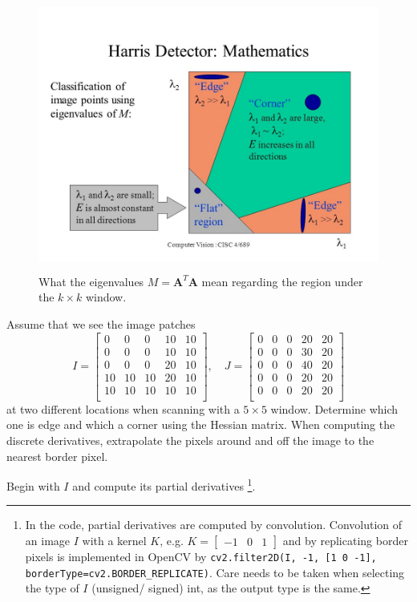 \documentclass[a4paper]{article}
\begin{document}
\begin{figure}[H]
    \centering
    \includegraphics[height=9cm]{img/opt_flow/harris_detector_eigen.jpg}
    \caption{What the eigenvalues $M = \textbf{A}^T\textbf{A}$ mean regarding the region under the $k\times k$ window.}
\end{figure}
\begin{exmp}
Assume that we see the image patches
\[
I = 
\begin{bmatrix}
0 & 0 & 0 & 10 & 10 \\
0 & 0 & 0 & 10 & 10\\
0 & 0 & 0& 20 & 10 \\
10 & 10 & 10 & 20 & 10 \\
10 & 10 & 10 & 10 & 10 \\
\end{bmatrix}, \quad
J =
\begin{bmatrix}
0 & 0 & 0 & 20 & 20 \\
0 & 0 & 0 & 30 & 20 \\
0 & 0 & 0 & 40 & 20 \\
0 & 0 & 0 & 20 & 20 \\
0 & 0 & 0 & 20 & 20 \\
\end{bmatrix}
\]
at two different locations when scanning with a $5\times 5$ window. Determine which one is edge and which a corner using the Hessian matrix. When computing the discrete derivatives, extrapolate the pixels around and off the image to the nearest border pixel.
\end{exmp}
Begin with $I$ and compute its partial derivatives \footnote{In the code, partial derivatives are computed by convolution. Convolution of an image $I$ with a kernel $K$, e.g. $K=\begin{bmatrix}
-1 & 0 & 1 \end{bmatrix}$ and by replicating border pixels is implemented in OpenCV by \texttt{cv2.filter2D(I, -1, [1 0 -1], borderType=cv2.BORDER_REPLICATE)}. Care needs to be taken when selecting the type of $I$ (unsigned/ signed) int, as the output type is the same.}.
\end{document}
